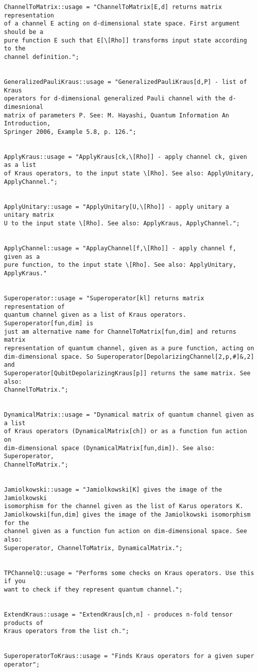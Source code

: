\documentclass[a4paper,11pt]{elsart}
\newcommand{\1}{{\rm 1\hspace{-0.9mm}l}}
\begin{document}
\begin{lstlisting}



ChannelToMatrix::usage = "ChannelToMatrix[E,d] returns matrix representation 
of a channel E acting on d-dimensional state space. First argument should be a 
pure function E such that E[\[Rho]] transforms input state according to the 
channel definition.";


GeneralizedPauliKraus::usage = "GeneralizedPauliKraus[d,P] - list of Kraus 
operators for d-dimensional generalized Pauli channel with the d-dimesnional 
matrix of parameters P. See: M. Hayashi, Quantum Information An Introduction, 
Springer 2006, Example 5.8, p. 126.";


ApplyKraus::usage = "ApplyKraus[ck,\[Rho]] - apply channel ck, given as a list 
of Kraus operators, to the input state \[Rho]. See also: ApplyUnitary, 
ApplyChannel.";


ApplyUnitary::usage = "ApplyUnitary[U,\[Rho]] - apply unitary a unitary matrix 
U to the input state \[Rho]. See also: ApplyKraus, ApplyChannel.";


ApplyChannel::usage = "ApplayChannel[f,\[Rho]] - apply channel f, given as a 
pure function, to the input state \[Rho]. See also: ApplyUnitary, ApplyKraus."


Superoperator::usage = "Superoperator[kl] returns matrix representation of 
quantum channel given as a list of Kraus operators. Superoperator[fun,dim] is 
just am alternative name for ChannelToMatrix[fun,dim] and returns matrix 
representation of quantum channel, given as a pure function, acting on 
dim-dimensional space. So Superoperator[DepolarizingChannel[2,p,#]&,2] and 
Superoperator[QubitDepolarizingKraus[p]] returns the same matrix. See also: 
ChannelToMatrix.";


DynamicalMatrix::usage = "Dynamical matrix of quantum channel given as a list 
of Kraus operators (DynamicalMatrix[ch]) or as a function fun action on 
dim-dimensional space (DynamicalMatrix[fun,dim]). See also: Superoperator, 
ChannelToMatrix.";


Jamiolkowski::usage = "Jamiolkowski[K] gives the image of the Jamiolkowski 
isomorphism for the channel given as the list of Karus operators K. 
Jamiolkowski[fun,dim] gives the image of the Jamiolkowski isomorphism for the 
channel given as a function fun action on dim-dimensional space. See also: 
Superoperator, ChannelToMatrix, DynamicalMatrix.";


TPChannelQ::usage = "Performs some checks on Kraus operators. Use this if you 
want to check if they represent quantum channel.";


ExtendKraus::usage = "ExtendKraus[ch,n] - produces n-fold tensor products of 
Kraus operators from the list ch.";


SuperoperatorToKraus::usage = "Finds Kraus operators for a given super 
operator";
\end{lstlisting}
\end{document}
